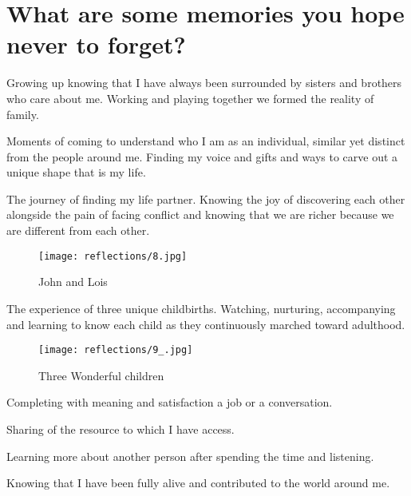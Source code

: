 \section{What are some memories you hope never to forget?}
Growing up knowing that I have always been surrounded by sisters and brothers who care about me.
Working and playing together we formed the reality of family.

Moments of coming to understand who I am as an individual, similar yet distinct from the people around me.
Finding my voice and gifts and ways to carve out a unique shape that is my life.

The journey of finding my life partner.
Knowing the joy of discovering each other alongside the pain of facing conflict and knowing that we are richer because we are different from each other.

\begin{figure}
\centering
\texttt{[image: reflections/8.jpg]}
\caption{
John and Lois
}
\end{figure}

The experience of three unique childbirths.
Watching, nurturing, accompanying and learning to know each child as they continuously marched toward adulthood.

\begin{figure}
\centering
\texttt{[image: reflections/9\_.jpg]}
\caption{
Three Wonderful children
}
\end{figure}


Completing with meaning and satisfaction a job or a conversation.

Sharing of the resource to which I have access.

Learning more about another person after spending the time and listening.

Knowing that I have been fully alive and contributed to the world around me.






